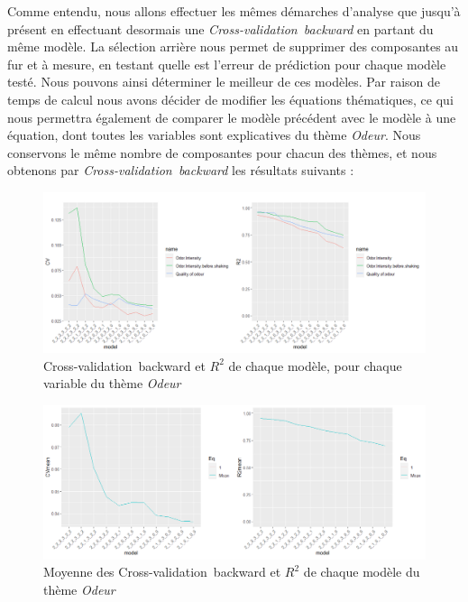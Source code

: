 \documentclass[a4paper,french,10pt]{article}
\begin{document}
\bigskip
\bigskip

Comme entendu, nous allons effectuer les mêmes démarches d'analyse que jusqu'à présent en effectuant desormais une \textit{Cross-validation~backward} en partant du même modèle. La sélection arrière nous permet de supprimer des composantes au fur et à mesure, en testant quelle est l’erreur de prédiction pour chaque modèle testé. Nous pouvons ainsi déterminer le meilleur de ces modèles. Par raison de temps de calcul nous avons décider de modifier les équations thématiques, ce qui nous permettra également de comparer le modèle précédent avec le modèle à une équation, dont toutes les variables sont explicatives du thème \textit{Odeur}. Nous conservons le même nombre de composantes pour chacun des thèmes, et nous obtenons par \textit{Cross-validation~backward} les résultats suivants : 

\begin{figure}[htp] 
	\centering
	\includegraphics[scale=0.52]{images/CV_all.png}
	\caption{Cross-validation~backward et $R^2$ de chaque modèle, pour chaque variable du thème \textit{Odeur}}
\end{figure}

\begin{figure}[htp] 
	\centering
	\includegraphics[scale=0.45]{images/CV_mean.png}
	\caption{Moyenne des Cross-validation~backward et $R^2$ de chaque modèle du thème \textit{Odeur}}
\end{figure}
\end{document}
